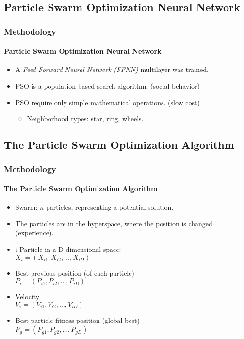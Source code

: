 \subsection{Particle Swarm Optimization Neural Network}
\frame
{
\frametitle{Methodology}
\framesubtitle{Particle Swarm Optimization Neural Network}
\begin{itemize}
	\item A \emph{Feed Forward Neural Network (FFNN)} multilayer was trained.
	\item PSO is a population based search algorithm. (social behavior)
	\item PSO require only simple mathematical operations. (slow cost)
	\begin{itemize}
		\item Neighborhood types: star, ring, wheels. 
	\end{itemize}
\end{itemize}
}

\subsection{The Particle Swarm Optimization Algorithm}
\frame
{
\frametitle{Methodology}
\framesubtitle{The Particle Swarm Optimization Algorithm}
\begin{itemize}
	\item Swarm: $n$ particles, representing a potential solution.
	\item The particles are in the hyperspace, where the position is changed (experience).
	\item i-Particle in a D-dimensional space:\\
	$X_{i} = (X_{i1}, X_{i2}, \ldots, X_{iD})$
	\item Best previous position (of each particle)\\
	$P_{i} = (P_{i1}, P_{i2}, \ldots, P_{iD})$
	\item Velocity\\
	$V_{i} = (V_{i1}, V_{i2}, \ldots, V_{iD})$
	\item Best particle fitness position (global best)\\
	$P_{g} = (P_{g1}, P_{g2}, \ldots, P_{gD})$
\end{itemize}
}

